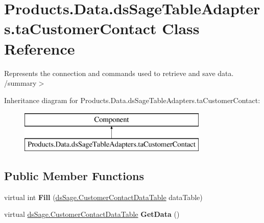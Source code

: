 \hypertarget{class_products_1_1_data_1_1ds_sage_table_adapters_1_1ta_customer_contact}{}\section{Products.\+Data.\+ds\+Sage\+Table\+Adapters.\+ta\+Customer\+Contact Class Reference}
\label{class_products_1_1_data_1_1ds_sage_table_adapters_1_1ta_customer_contact}


Represents the connection and commands used to retrieve and save data. /summary$>$  


Inheritance diagram for Products.\+Data.\+ds\+Sage\+Table\+Adapters.\+ta\+Customer\+Contact\+:\begin{figure}[H]
\begin{center}
\leavevmode
\includegraphics[height=2.000000cm]{class_products_1_1_data_1_1ds_sage_table_adapters_1_1ta_customer_contact}
\end{center}
\end{figure}
\subsection*{Public Member Functions}
\begin{DoxyCompactItemize}
\item 
virtual int {\bfseries Fill} (\hyperlink{class_products_1_1_data_1_1ds_sage_1_1_customer_contact_data_table}{ds\+Sage.\+Customer\+Contact\+Data\+Table} data\+Table)\hypertarget{class_products_1_1_data_1_1ds_sage_table_adapters_1_1ta_customer_contact_ae33f7de981fb7e9071d2e2f83ea411e4}{}\label{class_products_1_1_data_1_1ds_sage_table_adapters_1_1ta_customer_contact_ae33f7de981fb7e9071d2e2f83ea411e4}

\item 
virtual \hyperlink{class_products_1_1_data_1_1ds_sage_1_1_customer_contact_data_table}{ds\+Sage.\+Customer\+Contact\+Data\+Table} {\bfseries Get\+Data} ()\hypertarget{class_products_1_1_data_1_1ds_sage_table_adapters_1_1ta_customer_contact_abf72d95eeb9e27e143b94f8ac40a872a}{}\label{class_products_1_1_data_1_1ds_sage_table_adapters_1_1ta_customer_contact_abf72d95eeb9e27e143b94f8ac40a872a}

\end{DoxyCompactItemize}
